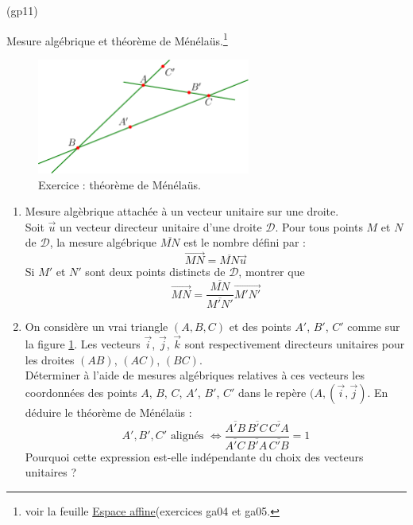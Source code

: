 \begin{tiny}(gp11)\end{tiny} Mesure algébrique et théorème de Ménéla{\"u}s.\footnote{voir la feuille \href{http://back.maquisdoc.net/data/temptex/fexga.pdf}{Espace affine}(exercices ga04 et ga05.}
\begin{figure}[h!]
  \centering
  \includegraphics[width=7cm]{Egp11_1.pdf}
  \caption{Exercice : théorème de Ménéla{\"u}s.}
  \label{fig:Egp11_1}
\end{figure}

%

\begin{enumerate}
 \item Mesure algèbrique attachée à un vecteur unitaire sur une droite.\\
Soit $\overrightarrow u$ un vecteur directeur unitaire d'une droite $\mathcal D$. Pour tous points $M$ et $N$ de $\mathcal D$, la mesure algébrique $\overline{MN}$ est le nombre défini par :
\begin{displaymath}
 \overrightarrow{MN} = \overline{MN}\overrightarrow{u}
\end{displaymath}
Si $M'$ et $N'$ sont deux points distincts de $\mathcal D$, montrer que 
\begin{displaymath}
 \overrightarrow{MN} = \dfrac{\overline{MN}}{\overline{M'N'}}\overrightarrow{M'N'}
\end{displaymath}
\item On considère un vrai triangle $(A,B,C)$ et des points $A'$, $B'$, $C'$ comme sur la figure \ref{fig:Egp11_1}. Les vecteurs $\overrightarrow i$, $\overrightarrow j$, $\overrightarrow k$ sont respectivement directeurs unitaires pour les droites $(AB)$, $(AC)$, $(BC)$.\\ Déterminer à l'aide de mesures algébriques relatives à ces vecteurs les coordonnées des points $A$, $B$, $C$, $A'$, $B'$, $C'$ dans le repère $(A,(\overrightarrow i , \overrightarrow j)$. En déduire le théorème de Ménéla{\"u}s :
\begin{displaymath}
 A' , B', C' \text{ alignés } \Leftrightarrow
\dfrac{\overline{A'B}\,\overline{B'C}\,\overline{C'A}}{\overline{A'C}\,\overline{B'A}\,\overline{C'B}}=1
\end{displaymath}
Pourquoi cette expression est-elle indépendante du choix des vecteurs unitaires ?
\end{enumerate}

